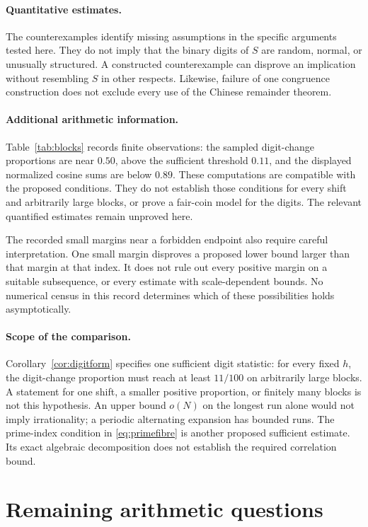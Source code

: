\paragraph{Quantitative estimates.}
The counterexamples identify missing assumptions in the specific
arguments tested here. They do not imply that the binary digits of $S$
are random, normal, or unusually structured. A constructed counterexample
can disprove an implication without resembling $S$ in other respects.
Likewise, failure of one congruence construction does not exclude every
use of the Chinese remainder theorem.

\paragraph{Additional arithmetic information.}
Table~\ref{tab:blocks} records finite observations: the sampled digit-change
proportions are near $0.50$, above the sufficient threshold $0.11$, and
the displayed normalized cosine sums are below $0.89$. These computations
are compatible with the proposed conditions. They do not establish those
conditions for every shift and arbitrarily large blocks, or prove a
fair-coin model for the digits. The relevant quantified estimates remain
unproved here.

The recorded small margins near a forbidden endpoint also require careful
interpretation. One small margin disproves a proposed lower bound larger
than that margin at that index. It does not rule out every positive margin
on a suitable subsequence, or every estimate with scale-dependent bounds.
No numerical census in this record determines which of these possibilities
holds asymptotically.

\paragraph{Scope of the comparison.}
Corollary~\ref{cor:digitform} specifies one sufficient digit statistic:
for every fixed $h$, the digit-change proportion must reach at least
$11/100$ on arbitrarily large blocks. A statement for one shift, a smaller
positive proportion, or finitely many blocks is not this hypothesis. An
upper bound $o(N)$ on the longest run alone would not imply irrationality;
a periodic alternating expansion has bounded runs. The prime-index
condition in \eqref{eq:primefibre} is another proposed sufficient estimate.
Its exact algebraic decomposition does not establish the required
correlation bound.
\section{Remaining arithmetic questions}

